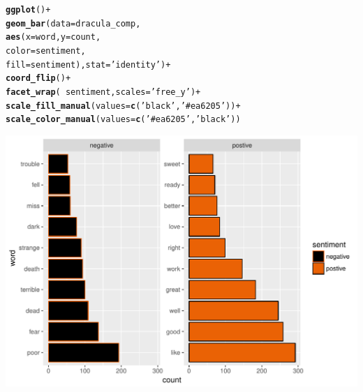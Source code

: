\documentclass{beamer}\usepackage[]{graphicx}\usepackage[]{color}
\makeatletter
\def\maxwidth{ %
  \ifdim\Gin@nat@width>\linewidth
    \linewidth
  \else
    \Gin@nat@width
  \fi
}
\newcommand{\hlstr}[1]{\textcolor[rgb]{0.192,0.494,0.8}{#1}}%
\newcommand{\hlopt}[1]{\textcolor[rgb]{0,0,0}{#1}}%
\newcommand{\hlstd}[1]{\textcolor[rgb]{0.345,0.345,0.345}{#1}}%
\newcommand{\hlkwc}[1]{\textcolor[rgb]{0.333,0.667,0.333}{#1}}%
\newcommand{\hlkwd}[1]{\textcolor[rgb]{0.737,0.353,0.396}{\textbf{#1}}}%
\newenvironment{kframe}{%
 \def\at@end@of@kframe{}%
 \ifinner\ifhmode%
  \def\at@end@of@kframe{\end{minipage}}%
  \begin{minipage}{\columnwidth}%
 \fi\fi%
 \def\FrameCommand##1{\hskip\@totalleftmargin \hskip-\fboxsep
 \colorbox{shadecolor}{##1}\hskip-\fboxsep
     \hskip-\linewidth \hskip-\@totalleftmargin \hskip\columnwidth}%
 \MakeFramed {\advance\hsize-\width
   \@totalleftmargin\z@ \linewidth\hsize
   \@setminipage}}%
 {\par\unskip\endMakeFramed%
 \at@end@of@kframe}
\newenvironment{knitrout}{}{} %
\makeatother
\begin{document}
\begin{frame}
\begin{knitrout}
\color{fgcolor}\begin{kframe}
\begin{alltt}
\hlkwd{ggplot}\hlstd{()}\hlopt{+}
  \hlkwd{geom_bar}\hlstd{(}\hlkwc{data} \hlstd{= dracula_comp,}
           \hlkwd{aes}\hlstd{(}\hlkwc{x} \hlstd{= word,} \hlkwc{y} \hlstd{= count,}
               \hlkwc{color} \hlstd{= sentiment,}
               \hlkwc{fill} \hlstd{= sentiment),} \hlkwc{stat} \hlstd{=} \hlstr{'identity'}\hlstd{)}\hlopt{+}
  \hlkwd{coord_flip}\hlstd{()}\hlopt{+}
  \hlkwd{facet_wrap}\hlstd{(}\hlopt{~}\hlstd{sentiment,} \hlkwc{scales} \hlstd{=} \hlstr{'free_y'}\hlstd{)}\hlopt{+}
  \hlkwd{scale_fill_manual}\hlstd{(}\hlkwc{values} \hlstd{=} \hlkwd{c}\hlstd{(}\hlstr{'black'}\hlstd{,} \hlstr{'#ea6205'}\hlstd{))}\hlopt{+}
  \hlkwd{scale_color_manual}\hlstd{(}\hlkwc{values} \hlstd{=} \hlkwd{c}\hlstd{(}\hlstr{'#ea6205'}\hlstd{,} \hlstr{'black'}\hlstd{))}
\end{alltt}
\end{kframe}
\includegraphics[width=\maxwidth]{figure/unnamed-chunk-16-1} 

\end{knitrout}

\end{frame}
\end{document}
